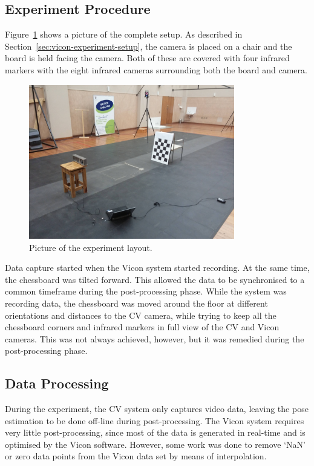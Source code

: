 \subsection{Experiment Procedure}

Figure~\ref{fig:pic-sys-layout} shows a picture of the complete setup. As described in Section~\ref{sec:vicon-experiment-setup}, the camera is placed on a chair and the board is held facing the camera. Both of these are covered with four infrared markers with the eight infrared cameras surrounding both the board and camera.  

\begin{figure}
  \centering
  \includegraphics[width=0.8\textwidth]{figures/chapter3/sys_1_low}
  \caption{Picture of the experiment layout.}
\label{fig:pic-sys-layout}
\end{figure}

Data capture started when the Vicon system started recording. At the same time, the chessboard was tilted forward. This allowed the data to be synchronised to a common timeframe during the post-processing phase. While the system was recording data, the chessboard was moved around the floor at different orientations and distances to the CV camera, while trying to keep all the chessboard corners and infrared markers in full view of the CV and Vicon cameras. This was not always achieved, however, but it was remedied during the post-processing phase.

\subsection{Data Processing}

During the experiment, the CV system only captures video data, leaving the pose estimation to be done off-line during post-processing. The Vicon system requires very little post-processing, since most of the data is generated in real-time and is optimised by the Vicon software. However, some work was done to remove `NaN' or zero data points from the Vicon data set by means of interpolation.

